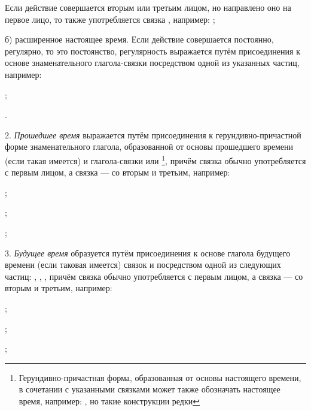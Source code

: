 Если действие совершается вторым или третьим лицом, но направлено оно на первое лицо, то также употребляется связка , например:
;

б) расширенное настоящее время. Если действие совершается постоянно, регулярно, то это постоянство, регулярность выражается путём присоединения к основе знаменательного глагола-связки  посредством одной из указанных частиц, например:

\begin{description}
	\item{};
	\item{}.
\end{description}

2. \emph{Прошедшее время} выражается путём присоединения к герундивно-причастной форме знаменательного глагола, образованной от основы прошедшего времени (если такая имеется) и глагола-связки  или \footnote[38]{Герундивно-причастная форма, образованная от основы настоящего времени, в сочетании с указанными связками может также обозначать настоящее время, например: , но такие конструкции редки},
причём связка  обычно употребляется с первым лицом, а связка  --- со вторым и третьим, например:

\begin{description}
	\item{};
	\item{};
	\item{};
\end{description}

3. \emph{Будущее время} образуется путём присоединения к основе глагола будущего времени (если таковая имеется) связок  и  посредством одной из следующих частиц: , , , причём связка
 обычно употребляется с первым лицом, а связка  --- со вторым и третьим, например:
\begin{description}
	\item{};
	\item{};
	\item{};
\end{description}

